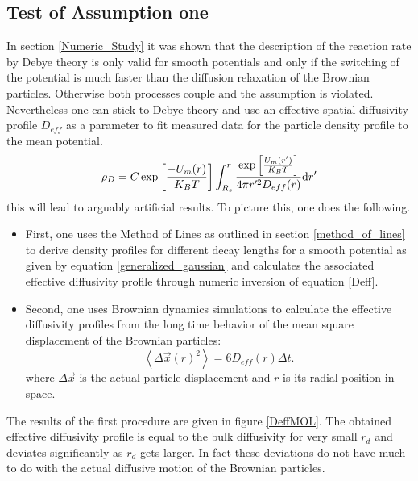\subsection{Test of Assumption one}
In section \ref{Numeric_Study} it was shown that the description of the reaction rate by Debye theory is only valid for smooth potentials and only if the switching of the potential is much faster than the diffusion relaxation of the Brownian particles. Otherwise both processes couple and the assumption is violated. Nevertheless one can stick to Debye theory and use an effective spatial diffusivity profile $D_{eff}$ as a parameter to fit measured data for the particle density profile to the mean potential. 
\begin{equation}
    \rho_D = C \exp\left[\frac{-U_m(r)}{K_B T}\right] \int_{R_s}^{r} \frac{\exp\left[\frac{U_m(r')}{K_B T}\right]}{4 \pi r'^{2} D_{eff}(r)}{\rm d} r'
    \label{Deff}
\end{equation}
this will lead to arguably artificial results. To picture this, one does the following. 
\begin{itemize}
    \item First, one uses the Method of Lines as outlined in section \ref{method_of_lines} to derive density profiles for different decay lengths for a smooth potential as given by equation \eqref{generalized_gaussian} and calculates the associated effective diffusivity profile through numeric inversion of equation \eqref{Deff}. 
    \item Second, one uses Brownian dynamics simulations to calculate the effective diffusivity profiles from the long time behavior of the mean square displacement of the Brownian particles: 
    \begin{equation}
        \left<\Delta \vec{x}(r)^{2}\right> = 6 D_{eff}(r) \Delta t.
        \label{msqd}
    \end{equation}
    where $\Delta \vec{x}$ is the actual particle displacement and $r$ is its radial position in space. \\

\end{itemize}
The results of the first procedure are given in figure \ref{DeffMOL}. The obtained effective diffusivity profile is equal to the bulk diffusivity for very small $r_d$ and deviates significantly as $r_d$ gets larger. In fact these deviations do not have much to do with the actual diffusive motion of the Brownian particles.\vspace{-0.3 cm}\\
